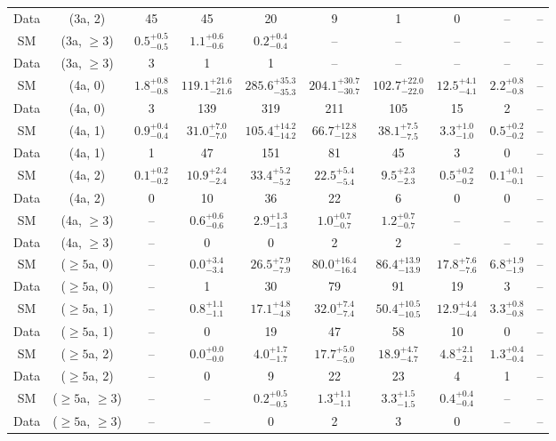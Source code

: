\begin{table}[h!]
{\begin{tabular}{cccccccccc}
	Data & (3a, 2) & 45 & 45 & 20 & 9 & 1 & 0 & -- & -- \\[0.5ex] 
	SM & (3a, $\ge3$) & $0.5^{+ 0.5 }_{- 0.5 }$ & $1.1^{+ 0.6 }_{- 0.6 }$ & $0.2^{+ 0.4 }_{- 0.4 }$ & -- & -- & -- & -- & -- \\[0.5ex] 
	Data & (3a, $\ge3$) & 3 & 1 & 1 & -- & -- & -- & -- & -- \\[0.5ex] 
	SM & (4a, 0) & $1.8^{+ 0.8 }_{- 0.8 }$ & $119.1^{+ 21.6 }_{- 21.6 }$ & $285.6^{+ 35.3 }_{- 35.3 }$ & $204.1^{+ 30.7 }_{- 30.7 }$ & $102.7^{+ 22.0 }_{- 22.0 }$ & $12.5^{+ 4.1 }_{- 4.1 }$ & $2.2^{+ 0.8 }_{- 0.8 }$ & -- \\[0.5ex] 
	Data & (4a, 0) & 3 & 139 & 319 & 211 & 105 & 15 & 2 & -- \\[0.5ex] 
	SM & (4a, 1) & $0.9^{+ 0.4 }_{- 0.4 }$ & $31.0^{+ 7.0 }_{- 7.0 }$ & $105.4^{+ 14.2 }_{- 14.2 }$ & $66.7^{+ 12.8 }_{- 12.8 }$ & $38.1^{+ 7.5 }_{- 7.5 }$ & $3.3^{+ 1.0 }_{- 1.0 }$ & $0.5^{+ 0.2 }_{- 0.2 }$ & -- \\[0.5ex] 
	Data & (4a, 1) & 1 & 47 & 151 & 81 & 45 & 3 & 0 & -- \\[0.5ex] 
	SM & (4a, 2) & $0.1^{+ 0.2 }_{- 0.2 }$ & $10.9^{+ 2.4 }_{- 2.4 }$ & $33.4^{+ 5.2 }_{- 5.2 }$ & $22.5^{+ 5.4 }_{- 5.4 }$ & $9.5^{+ 2.3 }_{- 2.3 }$ & $0.5^{+ 0.2 }_{- 0.2 }$ & $0.1^{+ 0.1 }_{- 0.1 }$ & -- \\[0.5ex] 
	Data & (4a, 2) & 0 & 10 & 36 & 22 & 6 & 0 & 0 & -- \\[0.5ex] 
	SM & (4a, $\ge3$) & -- & $0.6^{+ 0.6 }_{- 0.6 }$ & $2.9^{+ 1.3 }_{- 1.3 }$ & $1.0^{+ 0.7 }_{- 0.7 }$ & $1.2^{+ 0.7 }_{- 0.7 }$ & -- & -- & -- \\[0.5ex] 
	Data & (4a, $\ge3$) & -- & 0 & 0 & 2 & 2 & -- & -- & -- \\[0.5ex] 
	SM & ($\ge5$a, 0) & -- & $0.0^{+ 3.4 }_{- 3.4 }$ & $26.5^{+ 7.9 }_{- 7.9 }$ & $80.0^{+ 16.4 }_{- 16.4 }$ & $86.4^{+ 13.9 }_{- 13.9 }$ & $17.8^{+ 7.6 }_{- 7.6 }$ & $6.8^{+ 1.9 }_{- 1.9 }$ & -- \\[0.5ex] 
	Data & ($\ge5$a, 0) & -- & 1 & 30 & 79 & 91 & 19 & 3 & -- \\[0.5ex] 
	SM & ($\ge5$a, 1) & -- & $0.8^{+ 1.1 }_{- 1.1 }$ & $17.1^{+ 4.8 }_{- 4.8 }$ & $32.0^{+ 7.4 }_{- 7.4 }$ & $50.4^{+ 10.5 }_{- 10.5 }$ & $12.9^{+ 4.4 }_{- 4.4 }$ & $3.3^{+ 0.8 }_{- 0.8 }$ & -- \\[0.5ex] 
	Data & ($\ge5$a, 1) & -- & 0 & 19 & 47 & 58 & 10 & 0 & -- \\[0.5ex] 
	SM & ($\ge5$a, 2) & -- & $0.0^{+ 0.0 }_{- 0.0 }$ & $4.0^{+ 1.7 }_{- 1.7 }$ & $17.7^{+ 5.0 }_{- 5.0 }$ & $18.9^{+ 4.7 }_{- 4.7 }$ & $4.8^{+ 2.1 }_{- 2.1 }$ & $1.3^{+ 0.4 }_{- 0.4 }$ & -- \\[0.5ex] 
	Data & ($\ge5$a, 2) & -- & 0 & 9 & 22 & 23 & 4 & 1 & -- \\[0.5ex] 
	SM & ($\ge5$a, $\ge3$) & -- & -- & $0.2^{+ 0.5 }_{- 0.5 }$ & $1.3^{+ 1.1 }_{- 1.1 }$ & $3.3^{+ 1.5 }_{- 1.5 }$ & $0.4^{+ 0.4 }_{- 0.4 }$ & -- & -- \\[0.5ex] 
	Data & ($\ge5$a, $\ge3$) & -- & -- & 0 & 2 & 3 & 0 & -- & -- \\[0.5ex] 
	\hline
	\hline
\end{tabular}}
\end{table}
